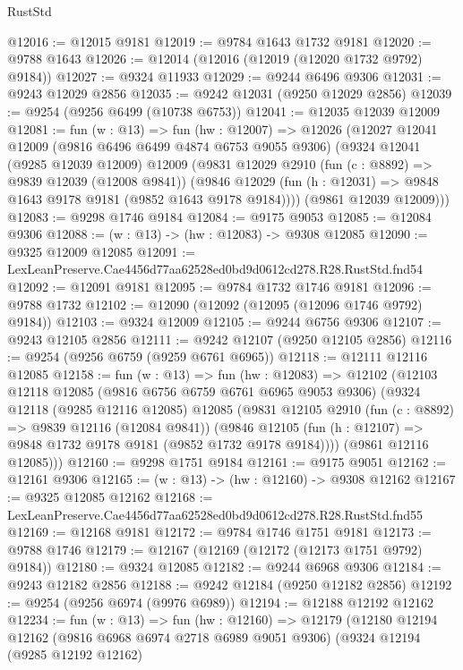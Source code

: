 \begin{lexlean}{RustStd}
\begin{coremodule}
@12016 := @12015 @9181
@12019 := @9784 @1643 @1732 @9181
@12020 := @9788 @1643
@12026 := @12014 (@12016 (@12019 (@12020 @1732 @9792) @9184))
@12027 := @9324 @11933
@12029 := @9244 @6496 @9306
@12031 := @9243 @12029 @2856
@12035 := @9242 @12031 (@9250 @12029 @2856)
@12039 := @9254 (@9256 @6499 (@10738 @6753))
@12041 := @12035 @12039 @12009
@12081 := fun (w : @13) =>
  fun (hw : @12007) =>
  @12026
    (@12027
      @12041
      @12009
      (@9816 @6496 @6499 @4874 @6753 @9055 @9306)
      (@9324
        @12041
        (@9285 @12039 @12009)
        @12009
        (@9831
          @12029
          @2910
          (fun (c : @8892) => @9839 @12039 (@12008 @9841))
          (@9846 @12029 (fun (h : @12031) => @9848 @1643 @9178 @9181 (@9852 @1643 @9178 @9184))))
        (@9861 @12039 @12009)))
@12083 := @9298 @1746 @9184
@12084 := @9175 @9053
@12085 := @12084 @9306
@12088 := (w : @13) -> (hw : @12083) -> @9308 @12085
@12090 := @9325 @12009 @12085
@12091 := LexLeanPreserve.Cae4456d77aa62528ed0bd9d0612cd278.R28.RustStd.fnd54
@12092 := @12091 @9181
@12095 := @9784 @1732 @1746 @9181
@12096 := @9788 @1732
@12102 := @12090 (@12092 (@12095 (@12096 @1746 @9792) @9184))
@12103 := @9324 @12009
@12105 := @9244 @6756 @9306
@12107 := @9243 @12105 @2856
@12111 := @9242 @12107 (@9250 @12105 @2856)
@12116 := @9254 (@9256 @6759 (@9259 @6761 @6965))
@12118 := @12111 @12116 @12085
@12158 := fun (w : @13) =>
  fun (hw : @12083) =>
  @12102
    (@12103
      @12118
      @12085
      (@9816 @6756 @6759 @6761 @6965 @9053 @9306)
      (@9324
        @12118
        (@9285 @12116 @12085)
        @12085
        (@9831
          @12105
          @2910
          (fun (c : @8892) => @9839 @12116 (@12084 @9841))
          (@9846 @12105 (fun (h : @12107) => @9848 @1732 @9178 @9181 (@9852 @1732 @9178 @9184))))
        (@9861 @12116 @12085)))
@12160 := @9298 @1751 @9184
@12161 := @9175 @9051
@12162 := @12161 @9306
@12165 := (w : @13) -> (hw : @12160) -> @9308 @12162
@12167 := @9325 @12085 @12162
@12168 := LexLeanPreserve.Cae4456d77aa62528ed0bd9d0612cd278.R28.RustStd.fnd55
@12169 := @12168 @9181
@12172 := @9784 @1746 @1751 @9181
@12173 := @9788 @1746
@12179 := @12167 (@12169 (@12172 (@12173 @1751 @9792) @9184))
@12180 := @9324 @12085
@12182 := @9244 @6968 @9306
@12184 := @9243 @12182 @2856
@12188 := @9242 @12184 (@9250 @12182 @2856)
@12192 := @9254 (@9256 @6974 (@9976 @6989))
@12194 := @12188 @12192 @12162
@12234 := fun (w : @13) =>
  fun (hw : @12160) =>
  @12179
    (@12180
      @12194
      @12162
      (@9816 @6968 @6974 @2718 @6989 @9051 @9306)
      (@9324
        @12194
        (@9285 @12192 @12162)

\end{coremodule}
\end{lexlean}
